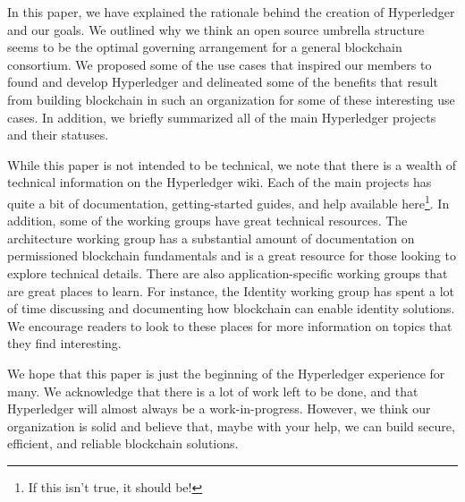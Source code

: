 In this paper, we have explained the rationale behind the creation of Hyperledger and our goals. We outlined why we think an open source umbrella structure seems to be the optimal governing arrangement for a general blockchain consortium. We proposed some of the use cases that inspired our members to found and develop Hyperledger and delineated some of the benefits that result from building blockchain in such an organization for some of these interesting use cases. In addition, we briefly summarized all of the main Hyperledger projects and their statuses.

While this paper is not intended to be technical, we note that there is a wealth of technical information on the Hyperledger wiki. Each of the main projects has quite a bit of documentation, getting-started guides, and help available here\footnote{If this isn't true, it should be!}. In addition, some of the working groups have great technical resources.  The architecture working group has a substantial amount of documentation on permissioned blockchain fundamentals and is a great resource for those looking to explore technical details. There are also application-specific working groups that are great places to learn. For instance, the Identity working group has spent a lot of time discussing and documenting how blockchain can enable identity solutions. We encourage readers to look to these places for more information on topics that they find interesting.   

We hope that this paper is just the beginning of the Hyperledger experience for many. We acknowledge that there is a lot of work left to be done, and that Hyperledger will almost always be a work-in-progress. However, we think our organization is solid and believe that, maybe with your help, we can build secure, efficient, and reliable blockchain solutions.
